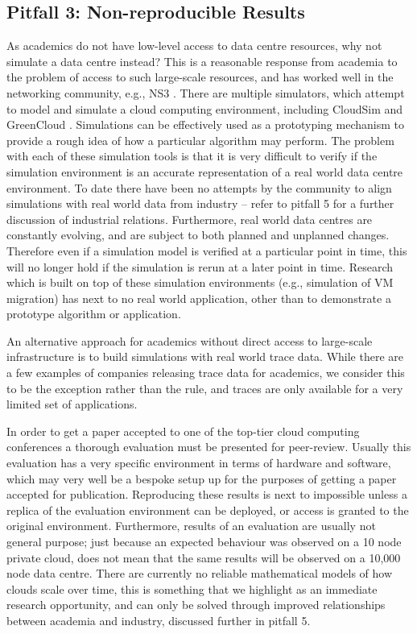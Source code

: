 \documentclass[letterpaper,twocolumn,10pt]{article}
\begin{document}
\subsection*{Pitfall 3: Non-reproducible Results} 

As academics do not have low-level access to data centre resources, why not simulate a data centre instead? This is a reasonable response from academia to the problem of access to such large-scale resources, and has worked well in the networking community, e.g., NS3 \cite{NS3}.  There are multiple simulators, which attempt to model and simulate a cloud computing environment, including CloudSim \cite{cloudsim} and GreenCloud \cite{greencloud}. Simulations can be effectively used as a prototyping mechanism to provide a rough idea of how a particular algorithm may perform. The problem with each of these simulation tools is that it is very difficult to verify if the simulation environment is an accurate representation of a real world data centre environment. To date there have been no attempts by the community to align simulations with real world data from industry -- refer to pitfall 5 for a further discussion of industrial relations. Furthermore, real world data centres are constantly evolving, and are subject to both planned and unplanned changes. Therefore even if a simulation model is verified at a particular point in time, this will no longer hold if the simulation is rerun at a later point in time. Research which is built on top of these simulation environments (e.g., simulation of VM migration) has next to no real world application, other than to demonstrate a prototype algorithm or application. 

An alternative approach for academics without direct access to large-scale infrastructure is to build simulations with real world trace data. While there are a few examples \cite{Benson, SWIM} of companies releasing trace data for academics, we consider this to be the exception rather than the rule, and traces are only available for a very limited set of applications. 

In order to get a paper accepted to one of the top-tier cloud computing conferences a thorough evaluation must be presented for peer-review. Usually this evaluation has a very specific environment in terms of hardware and software, which may very well be a bespoke setup up for the purposes of getting a paper accepted for publication. Reproducing these results is next to impossible unless a replica of the evaluation environment can be deployed, or access is granted to the original environment. Furthermore, results of an evaluation are usually not general purpose; just because an expected behaviour was observed on a 10 node private cloud, does not mean that the same results will be observed on a 10,000 node data centre. There are currently no reliable mathematical models of how clouds scale over time, this is something that we highlight as an immediate research opportunity, and can only be solved through improved relationships between academia and industry, discussed further in pitfall 5. 
\end{document}
